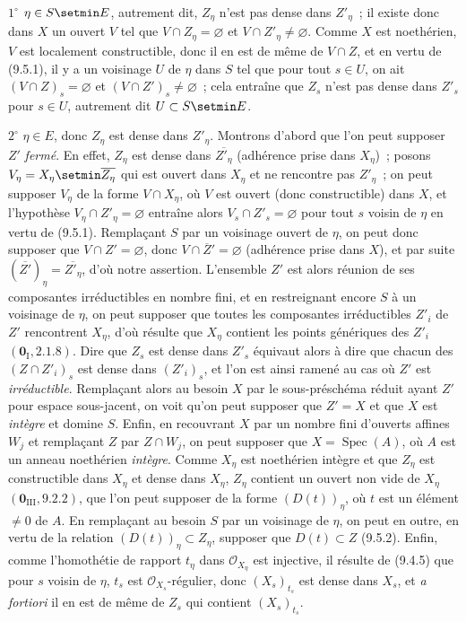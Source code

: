 $1^\circ$ $\eta\in S\setmin E$, autrement dit, $Z_\eta$ n'est pas dense dans
$Z'_\eta$~; il existe donc dans $X$ un ouvert $V$ tel que
$V\cap Z_\eta=\varnothing$ et $V\cap Z'_\eta\neq\varnothing$. Comme $X$ est
noethérien, $V$ est localement constructible, donc il en est de même de
$V\cap Z$, et en vertu de (9.5.1), il y a un voisinage $U$ de $\eta$ dans $S$
tel que pour tout $s\in U$, on ait $(V\cap Z)_s=\varnothing$ et
$(V\cap Z')_s\neq\varnothing$~; cela entraîne que $Z_s$ n'est pas dense dans
$Z'_s$ pour $s\in U$, autrement dit $U\subset S\setmin E$.


$2^\circ$ $\eta\in E$, donc $Z_\eta$ est dense dans $Z'_\eta$. Montrons
d'abord que l'on peut supposer $Z'$ \emph{fermé}. En effet, $Z_\eta$ est dense
dans $\overline{Z'_\eta}$ (adhérence prise dans $X_\eta$)~; posons
$V_\eta=X_\eta\setmin\overline{Z_\eta}$ qui est ouvert dans $X_\eta$ et ne
rencontre pas $Z'_\eta$~; on peut supposer $V_\eta$ de la forme $V\cap X_\eta$,
où $V$ est ouvert (donc constructible) dans $X$, et l'hypothèse
$V_\eta\cap Z'_\eta=\varnothing$ entraîne alors
$V_s\cap Z'_s=\varnothing$ pour tout $s$ voisin de $\eta$ en vertu de (9.5.1).
Remplaçant $S$ par un voisinage ouvert de $\eta$, on peut donc supposer que
$V\cap Z'=\varnothing$, donc $V\cap\overline Z'=\varnothing$ (adhérence prise
dans $X$), et par suite $(\overline{Z'})_\eta=\overline{Z'_\eta}$, d'où notre
assertion. L'ensemble $Z'$ est alors réunion de ses composantes irréductibles
en nombre fini, et en restreignant encore $S$ à un voisinage de $\eta$, on
peut supposer que toutes les composantes irréductibles $Z'_i$ de $Z'$
rencontrent $X_\eta$, d'où résulte que $X_\eta$ contient les points génériques
des $Z'_i$ $(\mathbf 0_{\mathrm I},2.1.8)$. Dire que $Z_s$ est dense dans
$Z'_s$ équivaut alors à dire que chacun des $(Z\cap Z'_i)_s$ est dense dans
$(Z'_i)_s$, et l'on est ainsi ramené au cas où $Z'$ est \emph{irréductible}.
Remplaçant alors au besoin $X$ par le sous-préschéma réduit ayant $Z'$ pour
espace sous-jacent, on voit qu'on peut supposer que $Z'=X$ et que $X$ est
\emph{intègre} et domine $S$. Enfin, en recouvrant $X$ par un nombre fini
d'ouverts affines $W_j$ et remplaçant $Z$ par $Z\cap W_j$, on peut supposer
que $X=\operatorname{Spec}(A)$, où $A$ est un anneau noethérien \emph{intègre}.
Comme $X_\eta$ est noethérien intègre et que $Z_\eta$ est constructible dans
$X_\eta$ et dense dans $X_\eta$, $Z_\eta$ contient un ouvert non vide de
$X_\eta$ $(\mathbf 0_{\mathrm{III}},9.2.2)$, que l'on peut supposer de la forme
$(D(t))_\eta$, où $t$ est un élément $\neq0$ de $A$. En remplaçant au besoin
$S$ par un voisinage de $\eta$, on peut en outre, en vertu de la relation
$(D(t))_\eta\subset Z_\eta$, supposer que $D(t)\subset Z$ (9.5.2). Enfin,
comme l'homothétie de rapport $t_\eta$ dans $\mathcal O_{X_\eta}$ est
injective, il résulte de (9.4.5) que pour $s$ voisin de $\eta$, $t_s$ est
$\mathcal O_{X_s}$-régulier, donc $(X_s)_{t_s}$ est dense dans $X_s$, et
\emph{a fortiori} il en est de même de $Z_s$ qui contient $(X_s)_{t_s}$.

